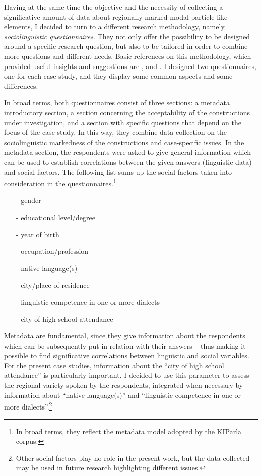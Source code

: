 Having at the same time the objective and the necessity of collecting a significative amount of data about regionally marked modal-particle-like elements, I decided to turn to a different research methodology, namely \textit{sociolinguistic questionnaires}. They not only offer the possibility to be designed around a specific research question, but also to be tailored in order to combine more questions and different needs. Basic references on this methodology, which provided useful insights and suggestions are \citet{Schleef2013}, \citet{KrugSell2013} and \citet{Dollinger2015}. I designed two questionnaires, one for each case study, and they display some common aspects and some differences.

In broad terms, both questionnaires consist of three sections: a metadata introductory section, a section concerning the acceptability of the constructions under investigation, and a section with specific questions that depend on the focus of the case study. In this way, they combine data collection on the sociolinguistic markedness of the constructions and case-specific issues. In the metadata section, the respondents were asked to give general information which can be used to establish correlations between the given answers (linguistic data) and social factors. The following list sums up the social factors taken into consideration in the questionnaires.\footnote{In broad terms, they reflect the metadata model adopted by the KIParla corpus.}

\begin{itemize}
\item[-] gender
\item[-] educational level/degree
\item[-] year of birth
\item[-] occupation/profession
\item[-] native language(s)
\item[-] city/place of residence
\item[-] linguistic competence in one or more dialects
\item[-] city of high school attendance
\end{itemize}

Metadata are fundamental, since they give information about the respondents which can be subsequently put in relation with their answers – thus making it possible to find significative correlations between linguistic and social variables. For the present case studies, information about the “city of high school attendance” is particularly important. I decided to use this parameter to assess the regional variety spoken by the respondents, integrated when necessary by information about “native language(s)” and “linguistic competence in one or more dialects”.\footnote{Other social factors play no role in the present work, but the data collected may be used in future research highlighting different issues.}

